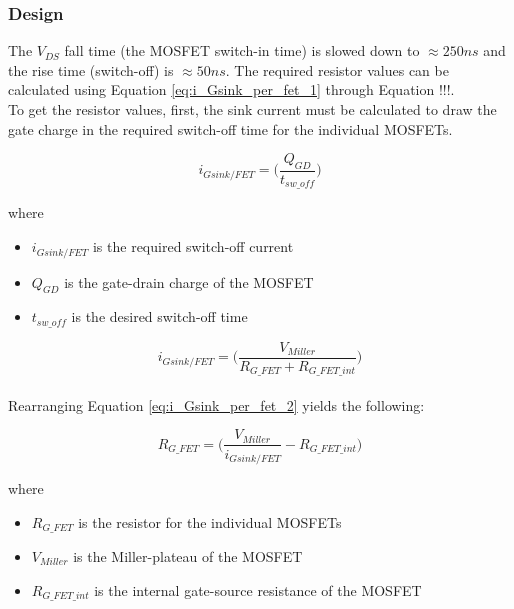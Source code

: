 \subsubsection{Design}

The $V_{DS}$ fall time (the MOSFET switch-in time) is slowed down to $\approx 250ns$ and the rise time (switch-off) is $\approx 50ns$. The required resistor values can be calculated using Equation \ref{eq:i_Gsink_per_fet_1} through Equation !!!. \\

To get the resistor values, first, the sink current must be calculated to draw the gate charge in the required switch-off time for the individual MOSFETs. 

    \begin{equation}
        i_{Gsink/FET} = \bigg( \frac{Q_{GD}}{t_{sw{\_}off}} \bigg)
        \label{eq:i_Gsink_per_fet_1}
    \end{equation}
    
    where
    
    \begin{itemize}
        \item $i_{Gsink/FET}$ is the required switch-off current
        \item $Q_{GD}$ is the gate-drain charge of the MOSFET
        \item $t_{sw{\_}off}$ is the desired switch-off time
    \end{itemize}
    
    \begin{equation}
        i_{Gsink/FET} = \bigg( \frac{V_{Miller}}{R_{G{\_}FET} + R_{G{\_}FET{\_}int}} \bigg)
        \label{eq:i_Gsink_per_fet_2}
    \end{equation} \\
    
    Rearranging Equation \ref{eq:i_Gsink_per_fet_2} yields the following:
    
    \begin{equation}
        R_{G{\_}FET} = \bigg( \frac{V_{Miller}}{i_{Gsink/FET}} - R_{G{\_}FET{\_}int} \bigg)
        \label{eq:i_Gsink_per_fet_2}
    \end{equation}
    
    where
    
    \begin{itemize}
        \item $R_{G{\_}FET}$ is the resistor for the individual MOSFETs
        \item $V_{Miller}$ is the Miller-plateau of the MOSFET
        \item $R_{G{\_}FET{\_}int}$ is the internal gate-source resistance of the MOSFET
    \end{itemize}
    
